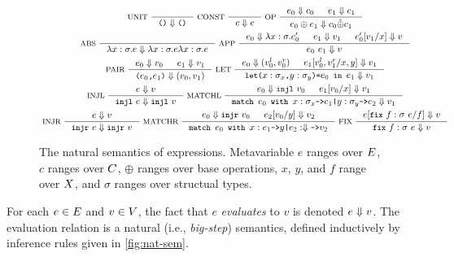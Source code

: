 \begin{figure}
  \centering
  \begin{gather*}
  \inference[ UNIT ]{ }{ \unit \evalsto \unit } 
  \inference[ CONST ]{ }{ c \evalsto c } 
  \inference[ OP ]{ %
    e_0 \evalsto c_0 & %
    e_1 \evalsto c_1 }{ %
    e_0 \oplus e_1 \evalsto c_0 \interp{\oplus} c_1 } \\
  \inference[ ABS ]{ }{ \abs{ x }{ \sigma }{ e } \evalsto %
    \abs{ x }{ \sigma }{ e } \abs{x}{\sigma}{e} } 
  \inference[ APP ]{ %
    e_0 \evalsto \abs{x}{\sigma}{e_0'} & %
    e_1 \evalsto v_1 &
    \replace{ e_0' }{ x }{ v_1 } \evalsto v }{ %
    e_0\ e_1 \evalsto v } \\
  \inference[ PAIR ]{ %
    e_0 \evalsto v_0 & e_1 \evalsto v_1 }{ %
    \pair{ e_0 }{ e_1 } \evalsto (v_0, v_1) } 
  \inference[ LET ]{
    e_0 \evalsto (v_0^l, v_0^r) &
    \replace{ e_1 }{ x, y }{ v_0^l, v_1^r } \evalsto v_1 }{ %
    \letexp{x}{\sigma_x}{y}{\sigma_y}{e_0}{e_1} \evalsto v_1 } \\
  \inference[ INJL ]{ e \evalsto v }{ %
    \injl\ e \evalsto \injl\ v } 
  \inference[ MATCHL ]{
    e_0 \evalsto \injl\ v_0 & %
    \replace{ e_1 }{ x }{ v_0 } \evalsto v_1 }{ %
    \matchexp{ e_0 }{ x }{\sigma_x}{ e_1 }{ y }{\sigma_y}{ e_2 } \evalsto v_1 } \\
  \inference[ INJR ]{ e \evalsto v }{ \injr\ e \evalsto \injr\ v }
  \inference[ MATCHR ]{
    e_0 \evalsto \injr\ v_0 &
    \replace{ e_2 }{ y }{ v_0 } \evalsto v_2 }{ %
    \matchexp{ e_0 }{ x }{ e_1 }{ y }{ e_2 } \evalsto v_2 } 
  \inference[ FIX ]{ \replace{e}{ f }{ \fix{ f }{\sigma}{ e } } \evalsto v } %
  { \fix{ f }{\sigma}{ e } \evalsto v }
  \end{gather*}
  \caption{The natural semantics of expressions.
    Metavariable $e$ ranges over $E$, %
    $c$ ranges over $C$, %
    $\oplus$ ranges over base operations, %
    $x$, $y$, and $f$ range over $X$, and
    $\sigma$ ranges over structual types.}
  \label{fig:nat-sem}
\end{figure}
%
For each $e \in E$ and $v \in V$, the fact that $e$
\emph{evaluates} to $v$ is denoted $e \Downarrow v$.
% 
The evaluation relation is a natural (i.e., \emph{big-step})
semantics, defined inductively by inference rules given in
\autoref{fig:nat-sem}.


